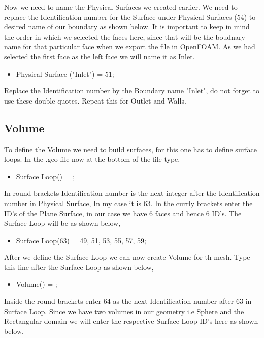 \flushleft Now we need to name the Physical Surfaces we created earlier. We need to replace the Identification number for the Surface under Physical Surfaces (54) to desired name of our boundary as shown below. It is important to keep in mind the order in which we selected the faces here, since that will be the boudnary name for that particular face when we export the file in OpenFOAM. As we had selected the first face as the left face we will name it as Inlet.

\begin{itemize}
  \item Physical Surface ("Inlet") = {51};
\end{itemize}

Replace the Identification number by the Boundary name "Inlet", do not forget to use these double quotes. Repeat this for Outlet and Walls.

\subsection{Volume}

To define the Volume we need to build surfaces, for this one has to define surface loops. In the .geo file now at the bottom of the file type,

\begin{itemize}
  \item Surface Loop() = {};
\end{itemize}

\flushleft In round brackets Identification number is the next integer after the Identification number in Physical Surface, In my case it is 63. In the currly brackets enter the ID's of the Plane Surface, in our case we have 6 faces and hence 6 ID's. The Surface Loop will be as shown below,

\begin{itemize}
  \item Surface Loop(63) = {49, 51, 53, 55, 57, 59};
\end{itemize}

\flushleft After we define the Surface Loop we can now create Volume for th mesh. Type this line after the Surface Loop as shown below,

\begin{itemize}
  \item Volume() = {};
\end{itemize}

\flushleft Inside the round brackets enter 64 as the next Identification number after 63 in Surface Loop. Since we have two volumes in our geometry i.e Sphere and the Rectangular domain we will enter the respective Surface Loop ID's here as shown below.

